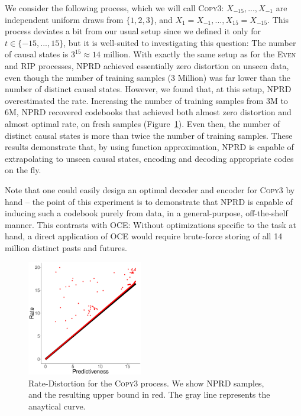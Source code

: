 \documentclass[entropy,article,submit,moreauthors,pdftex,10pt,a4paper]{Definitions/mdpi}
\begin{document}
We consider the following process, which we will call \textsc{Copy3}: $X_{-15}, ..., X_{-1}$ are independent uniform draws from $\{1,2,3\}$, and $X_1 = X_{-1}, ..., X_{15} = X_{-15}$.
This process deviates a bit from our usual setup since we defined it only for $t \in \{-15, ..., 15\}$, but it is well-suited to investigating this question:
The number of causal states is $3^{15} \approx 14$ million.
With exactly the same setup as for the \textsc{Even} and \textsc{RIP} processes, NPRD achieved essentially zero distortion on unseen data, even though the number of training samples (3 Million) was far lower than the number of distinct causal states.
However, we found that, at this setup, NPRD overestimated the rate.
Increasing the number of training samples from 3M to 6M, NPRD recovered codebooks that achieved both almost zero distortion and almost optimal rate, on fresh samples (Figure~\ref{fig:repeat}).
Even then, the number of distinct causal states is more than twice the number of training samples.
These results demonstrate that, by using function approximation, NPRD is capable of extrapolating to unseen causal states, encoding and decoding appropriate codes on the fly.


Note that one could easily design an optimal decoder and encoder for \textsc{Copy3} by hand -- the point of this experiment is to demonstrate that NPRD is capable of inducing such a codebook purely from data, in a general-purpose, off-the-shelf manner.
This contrasts with OCE:
Without optimizations specific to the task at hand, a direct application of OCE would require brute-force storing of all 14 million distinct pasts and futures.



\begin{figure}
\includegraphics[width=0.45\textwidth]{code/figures/repeat3-info.pdf}
	\caption{Rate-Distortion for the \textsc{Copy3} process. We show NPRD samples, and the resulting upper bound in red. The gray line represents the anaytical curve.}\label{fig:repeat}
\end{figure}
\end{document}
